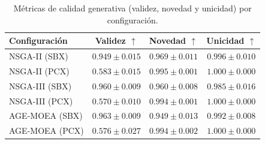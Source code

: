 \begin{table}[htbp]
\centering
\caption{Métricas de calidad generativa (validez, novedad y unicidad) por configuración.}
\label{tab:generacion}
\begin{tabular}{lccc}
\toprule
Configuración & Validez $\uparrow$ & Novedad $\uparrow$ & Unicidad $\uparrow$ \\
\midrule
NSGA-II (SBX) & $0.949 \pm 0.015$ & $0.969 \pm 0.011$ & $0.996 \pm 0.010$ \\
NSGA-II (PCX) & $0.583 \pm 0.015$ & $\mathbf{0.995 \pm 0.001}$ & $\mathbf{1.000 \pm 0.000}$ \\
NSGA-III (SBX) & $0.960 \pm 0.009$ & $0.960 \pm 0.008$ & $0.985 \pm 0.016$ \\
NSGA-III (PCX) & $0.570 \pm 0.010$ & $0.994 \pm 0.001$ & $1.000 \pm 0.000$ \\
AGE-MOEA (SBX) & $\mathbf{0.963 \pm 0.009}$ & $0.949 \pm 0.013$ & $0.992 \pm 0.008$ \\
AGE-MOEA (PCX) & $0.576 \pm 0.027$ & $0.994 \pm 0.002$ & $1.000 \pm 0.000$ \\
\bottomrule
\end{tabular}
\end{table}